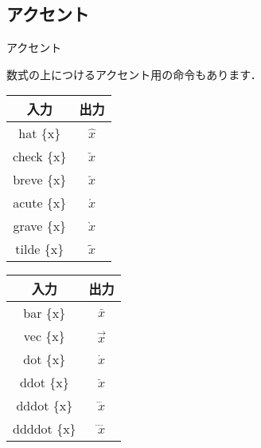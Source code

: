 \documentclass[slide,dvipdfmx]{beamer}
\newcommand{\bs}{\texttt{\symbol{"5C}}}
\newcommand{\acc}[1]{\bs #1 \{x\}}
\begin{document}
\subsection{アクセント}
\begin{frame}{アクセント}

数式の上につけるアクセント用の命令もあります．

\begin{multicols}{2}

\begin{tabular}{|c|c|} \hline
入力 & 出力 \\ \hline
\acc{hat} & $\hat{x}$ \\ \hline
\acc{check} & $\check{x}$ \\ \hline
\acc{breve} & $\breve{x}$ \\ \hline
\acc{acute} & $\acute{x}$ \\ \hline
\acc{grave} & $\grave{x}$ \\ \hline
\acc{tilde} & $\tilde{x}$ \\ \hline
\end{tabular}

\begin{tabular}{|c|c|} \hline
入力 & 出力 \\ \hline
\acc{bar} & $\bar{x}$ \\ \hline
\acc{vec} & $\vec{x}$ \\ \hline
\acc{dot} & $\dot{x}$ \\ \hline
\acc{ddot} & $\ddot{x}$ \\ \hline
\acc{dddot} & $\dddot{x}$ \\ \hline
\acc{ddddot} & $\ddddot{x}$ \\ \hline
\end{tabular}

\end{multicols}

\end{frame}
\end{document}
